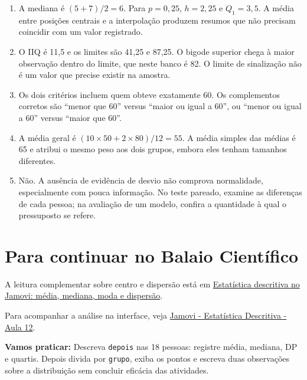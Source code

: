 \begin{enumerate}
  \item A mediana é $(5+7)/2=6$. Para $p=0{,}25$, $h=2{,}25$ e $Q_1=3{,}5$. A média entre posições centrais e a interpolação produzem resumos que não precisam coincidir com um valor registrado.
  \item O IIQ é 11,5 e os limites são 41,25 e 87,25. O bigode superior chega à maior observação dentro do limite, que neste banco é 82. O limite de sinalização não é um valor que precise existir na amostra.
  \item Os dois critérios incluem quem obteve exatamente 60. Os complementos corretos são ``menor que 60'' versus ``maior ou igual a 60'', ou ``menor ou igual a 60'' versus ``maior que 60''.
  \item A média geral é $(10\times50+2\times80)/12=55$. A média simples das médias é 65 e atribui o mesmo peso aos dois grupos, embora eles tenham tamanhos diferentes.
  \item Não. A ausência de evidência de desvio não comprova normalidade, especialmente com pouca informação. No teste pareado, examine as diferenças de cada pessoa; na avaliação de um modelo, confira a quantidade à qual o pressuposto se refere.
\end{enumerate}

\section{Para continuar no Balaio Científico}

A leitura complementar sobre centro e dispersão está em \href{https://www.balaiocientifico.com/2026/10/estatistica-descritiva-no-jamovi-media.html}{Estatística descritiva no Jamovi: média, mediana, moda e dispersão}.

Para acompanhar a análise na interface, veja \href{https://www.youtube.com/watch?v=kQEtA1KAG10}{Jamovi - Estatística Descritiva - Aula 12}.

\textbf{Vamos praticar:} Descreva \texttt{depois} nas 18 pessoas: registre média, mediana, DP e quartis. Depois divida por \texttt{grupo}, exiba os pontos e escreva duas observações sobre a distribuição sem concluir eficácia das atividades.
